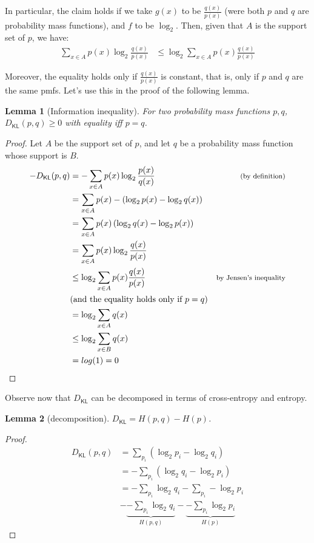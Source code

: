 \documentclass[
  letterpaper,
  DIV=11,
  numbers=noendperiod]{scrartcl}
\newcommand{\dkl}{D_{\mathsf{KL}}} %
\newtheorem{lemma}{Lemma}
\begin{document}
In particular, the claim holds if we take \(g(x)\) to be
\(\frac{q(x)}{p(x)}\) (were both \(p\) and \(q\) are probability mass
functions), and \(f\) to be \(\log_2\). Then, given that \(A\) is the
support set of \(p\), we have: \begin{align*}
\sum_{x\in A}p(x) \log_2 \frac{q(x)}{p(x)} & \leq \log_2 \sum_{x\in A}p(x)\frac{q(x)}{p(x)}
\end{align*}

\noindent Moreover, the equality holds only if \(\frac{q(x)}{p(x)}\) is
constant, that is, only if \(p\) and \(q\) are the same pmfs. Let's use
this in the proof of the following lemma.

\begin{lemma}[Information inequality] For two probability mass functions $p, q$, $\dkl(p,q)\geq 0$ with 
equality iff $p=q$.
\end{lemma}

\begin{proof}
Let $A$ be the support set of $p$, and let $q$ be a probability mass function whose support is $B$.
\begin{align*}
- \dkl(p,q) & = - \sum_{x\in A}p(x) \log_2 \frac{p(x)}{q(x)}& \mbox{\footnotesize (by definition)} \\
&  =  \sum_{x\in A}p(x)  - \left(\log_2 p(x) - \log_2 q(x)\right)& \\
&  =  \sum_{x\in A}p(x)   \left(\log_2 q(x) - \log_2 p(x)\right)& \\
& =  \sum_{x\in A} p(x) \log_2 \frac{q(x)}{p(x)}& \\
& \leq \log_2 \sum_{x\in A} p(x)\frac{q(x)}{p(x)} & \mbox{\footnotesize by Jensen's inequality}\\
& \mbox{(and the equality holds only if $p = q$)}\\
& = \log_2 \sum_{x\in A} q(x)  & \\
& \leq \log_2 \sum_{x\in B} q(x) & \\
& = log (1)  = 0 &\\
\end{align*}
\end{proof}

Observe now that \(\dkl\) can be decomposed in terms of cross-entropy
and entropy.

\begin{lemma}[decomposition] $\dkl = H(p,q) - H(p)$. \end{lemma}

\begin{proof}
\begin{align*}
\dkl (p, q) & = \sum_{p_{i}} \left( \log_2 p_i - \log_2 q_i \right) \\
& =   - \sum_{p_{i}}\left( \log_2 q_{i} - \log_2 p_{i} \right) \\
& = - \sum_{p_{i}} \log_{2} q_{i} - \sum_{p_{i}} - \log_{2} p_{i}   \\
& -  \underbrace{- \sum_{p_{i}} \log_2 q_{i}}_{H(p,q)}    - \underbrace{- \sum_{p_i}  \log_2 p_{i}}_{H(p)}
\end{align*}
\end{proof}
\end{document}
